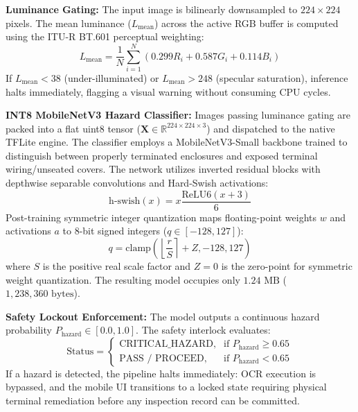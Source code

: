 \documentclass[conference]{IEEEtran}
\begin{document}
\textbf{Luminance Gating:} The input image is bilinearly downsampled to $224 \times 224$ pixels. The mean luminance ($L_{\text{mean}}$) across the active RGB buffer is computed using the ITU-R BT.601 perceptual weighting:
\begin{equation}
L_{\text{mean}} = \frac{1}{N} \sum_{i=1}^N \left( 0.299 R_i + 0.587 G_i + 0.114 B_i \right)
\label{eq:luma}
\end{equation}
If $L_{\text{mean}} < 38$ (under-illuminated) or $L_{\text{mean}} > 248$ (specular saturation), inference halts immediately, flagging a visual warning without consuming CPU cycles.

\textbf{INT8 MobileNetV3 Hazard Classifier:} Images passing luminance gating are packed into a flat uint8 tensor ($\mathbf{X} \in \mathbb{R}^{224 \times 224 \times 3}$) and dispatched to the native TFLite engine. The classifier employs a MobileNetV3-Small backbone trained to distinguish between properly terminated enclosures and exposed terminal wiring/unseated covers. The network utilizes inverted residual blocks with depthwise separable convolutions and Hard-Swish activations:
\begin{equation}
\text{h-swish}(x) = x \frac{\text{ReLU6}(x + 3)}{6}
\label{eq:hswish}
\end{equation}
Post-training symmetric integer quantization maps floating-point weights $w$ and activations $a$ to 8-bit signed integers ($q \in [-128, 127]$):
\begin{equation}
q = \text{clamp}\left( \left\lfloor \frac{r}{S} \right\rceil + Z, -128, 127 \right)
\label{eq:quant}
\end{equation}
where $S$ is the positive real scale factor and $Z = 0$ is the zero-point for symmetric weight quantization. The resulting model occupies only $1.24\text{~MB}$ ($1,238,360\text{~bytes}$).

\textbf{Safety Lockout Enforcement:} The model outputs a continuous hazard probability $P_{\text{hazard}} \in [0.0, 1.0]$. The safety interlock evaluates:
\begin{equation}
\text{Status} = 
\begin{cases} 
\text{CRITICAL\_HAZARD}, & \text{if } P_{\text{hazard}} \ge 0.65 \\
\text{PASS / PROCEED}, & \text{if } P_{\text{hazard}} < 0.65 
\end{cases}
\label{eq:hazard_eval}
\end{equation}
If a hazard is detected, the pipeline halts immediately: OCR execution is bypassed, and the mobile UI transitions to a locked state requiring physical terminal remediation before any inspection record can be committed.
\end{document}
